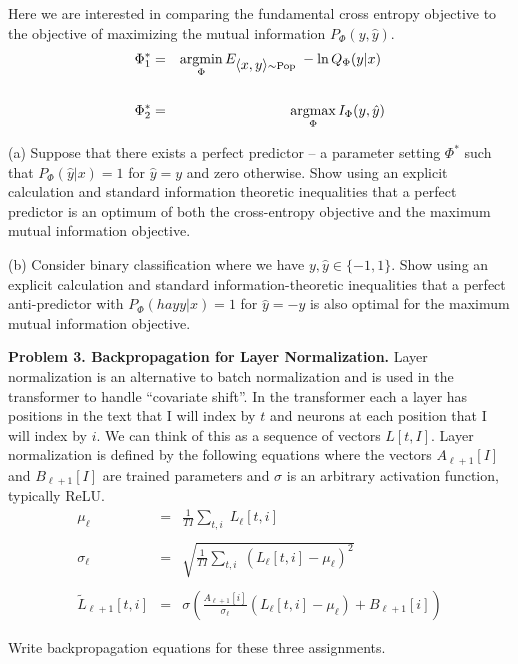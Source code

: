 Here we are interested in comparing the fundamental cross entropy objective to the objective of maximizing the mutual information $P_\Phi(y,\hat{y})$.
\begin{eqnarray*}
  \Phi^*_1 & = & \operatorname*{argmin}_\Phi E_{{\mbox{$\langle x,y\rangle$}}\sim \mathrm{Pop}}\;-\ln Q_\Phi(y|x)\; \\
  \\
  \Phi^*_2 & = & \operatorname*{argmax}_\Phi I_\Phi(y,\hat{y})
\end{eqnarray*}

\medskip

(a) Suppose that there exists a perfect predictor -- a parameter setting $\Phi^*$ such that $P_\Phi(\hat{y}|x) = 1$ for $\hat{y} = y$ and zero otherwise.
Show using an explicit calculation and standard information theoretic inequalities that a perfect predictor
is an optimum of both the cross-entropy objective and the maximum mutual information objective.  

(b) Consider binary classification where we have $y,\hat{y} \in \{-1,1\}$.  Show using an explicit calculation and standard information-theoretic inequalities
that a perfect anti-predictor with $P_\Phi(hay{y}|x) = 1$ for $\hat{y}= -y$
is also optimal for the maximum mutual information objective.

\bigskip

{\bf Problem 3.  Backpropagation for Layer Normalization.} Layer normalization is an alternative to batch normalization and is used in the transformer to handle ``covariate shift''. In the transformer each a layer has positions in the text that I will index by $t$ and neurons at each position that I will index by $i$.
We can think of this as a sequence of vectors $L[t,I]$.
Layer normalization is defined by the following equations where the vectors $A_{\ell+1}[I]$ and $B_{\ell+1}[I]$ are trained parameters and $\sigma$ is an
arbitrary activation function, typically ReLU.
\begin{eqnarray*}
  \mu_\ell & = & \frac{1}{TI} \sum_{t,i} \;L_\ell[t,i] \\
  \\
  \sigma_{\ell} & = & \sqrt{\frac{1}{TI} \sum_{t,i}\;(L_\ell[t,i] - \mu_\ell)^2} \\
  \\
  \tilde{L}_{\ell+1}[t,i] & = & \sigma\left(\frac{A_{\ell+1}[i]}{\sigma_\ell}(L_\ell[t,i] -\mu_\ell) + B_{\ell+1}[i]\right)
\end{eqnarray*}

Write backpropagation equations for these three assignments.



